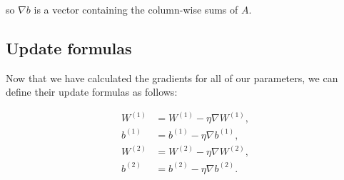 so $\nabla b$ is a vector containing the column-wise sums of $A$. 

\subsection{Update formulas}
Now that we have calculated the gradients for all of our parameters, we can
define their update formulas as follows:

\begin{align*}
W^{(1)} &= W^{(1)} - \eta \nabla W^{(1)},\\
b^{(1)} &= b^{(1)} - \eta \nabla b^{(1)},\\
W^{(2)} &= W^{(2)} - \eta \nabla W^{(2)},\\
b^{(2)} &= b^{(2)} - \eta \nabla b^{(2)}.
\end{align*}
